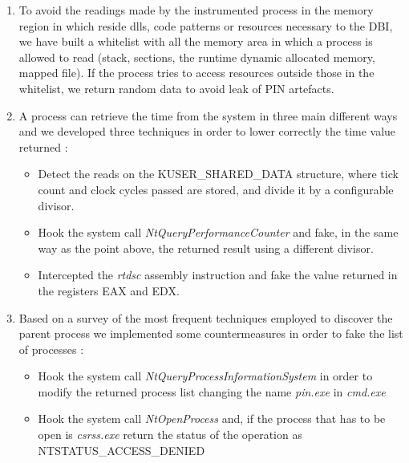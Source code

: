 \begin{enumerate}
\item To avoid the readings made by the instrumented process in the memory region in which reside dlls, code patterns or resources necessary to the DBI, we have built a whitelist with all the memory area in which a process is allowed to read (stack, sections, the runtime dynamic allocated memory, mapped file). If the process tries to access resources outside those in the whitelist, we return random data to avoid leak of PIN artefacts.

\item A process can retrieve the time from the system in three main different ways and we developed three techniques in order to lower correctly the time value returned :

\begin{itemize}
\item Detect the reads on the KUSER\_SHARED\_DATA structure, where tick count and clock cycles passed are stored, and divide it by a configurable divisor.

\item Hook the system call \textit{NtQueryPerformanceCounter} and fake, in the same way as the point above, the returned result using a different divisor.

\item Intercepted the \textit{rtdsc} assembly instruction and fake the value returned in the registers EAX and EDX.
\end{itemize}

\item Based on a survey \cite{Controlling-Windows-process-list} of the most frequent techniques employed to discover the parent process we implemented some countermeasures in order to fake the list of processes :

\begin{itemize}
\item Hook the system call \textit{NtQueryProcessInformationSystem} in order to modify the returned process list changing the name \textit{pin.exe} in \textit{cmd.exe}

\item Hook the system call \textit{NtOpenProcess} and, if the process that has to be open is \textit{csrss.exe} return the status of the operation as NTSTATUS\_ACCESS\_DENIED
\end{itemize}

\end{enumerate}

